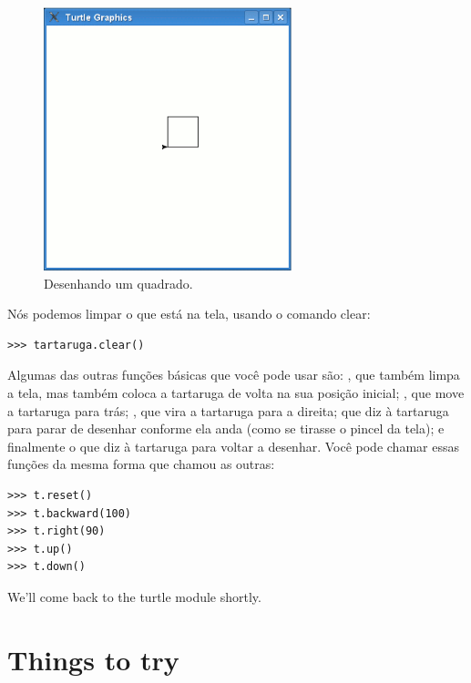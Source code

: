 \begin{figure}
\begin{center}
\includegraphics[width=72mm]{eps/figure16.eps}
\end{center}
\caption{Desenhando um quadrado.}\label{fig16}
\end{figure}

Nós podemos limpar o que está na tela, usando o comando clear:

\begin{listing}
\begin{verbatim}
>>> tartaruga.clear()
\end{verbatim}
\end{listing}

Algumas das outras funções básicas que você pode usar são: , que também limpa a tela, mas também coloca a tartaruga de volta na sua posição inicial; , que move a tartaruga para trás; , que vira a tartaruga para a direita;  que diz à tartaruga para parar de desenhar conforme ela anda (como se tirasse o pincel da tela); e finalmente o  que diz à tartaruga para voltar a desenhar. Você pode chamar essas funções da mesma forma que chamou as outras:

\begin{listing}
\begin{verbatim}
>>> t.reset()
>>> t.backward(100)
>>> t.right(90)
>>> t.up()
>>> t.down()
\end{verbatim}
\end{listing}

\noindent
We'll come back to the turtle module shortly.

\section{Things to try}

